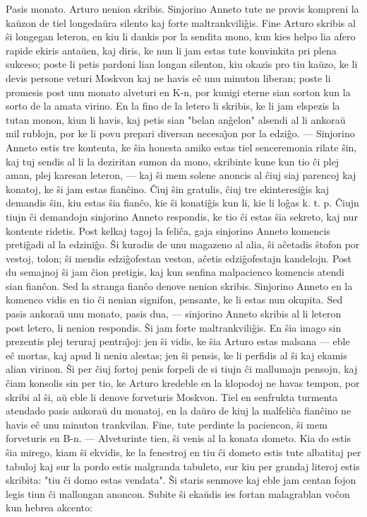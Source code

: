    Pasis monato. Arturo nenion skribis. Sinjorino Anneto tute ne
provis kompreni la ka\u uzon de tiel longeda\u ura silento kaj forte
maltrankvili\^gis. Fine Arturo skribis al \^si longegan leteron, en
kiu li dankis por la sendita mono, kun kies helpo lia afero rapide
ekiris anta\u uen, kaj diris, ke nun li jam estas tute konvinkita
pri plena sukceso; poste li petis pardoni lian longan silenton, kiu
okazis pro tiu ka\u uzo, ke li devis persone veturi Moskvon kaj ne
havis e\^c unu minuton liberan; poste li promesis post unu monato
alveturi en K-n, por kunigi eterne sian sorton kun la sorto de la
amata virino. En la fino de la letero li skribis, ke li jam elspezis
la tutan monon, kiun li havis, kaj petis sian "belan an\^gelon"
alsendi al li ankora\u u mil rublojn, por ke li povu prepari
diversan necesa\^{\j}on por la edzi\^go. --- Sinjorino Anneto estis
tre kontenta, ke \^sia honesta amiko estas tiel senceremonia rilate
\^sin, kaj tuj sendis al li la deziritan sumon da mono, skribinte
kune kun tio \^ci plej aman, plej karesan leteron, --- kaj \^si mem
solene anoncis al \^ciuj siaj parencoj kaj konatoj, ke \^si jam
estas fian\^cino. \^Ciuj \^sin gratulis, \^ciuj tre ekinteresi\^gis
kaj demandis \^sin, kiu estas \^sia fian\^co, kie \^si konati\^gis
kun li, kie li lo\^gas k. t. p. \^Ciujn tiujn \^ci demandojn
sinjorino Anneto respondis, ke tio \^ci estas \^sia sekreto, kaj nur
kontente ridetis. Post kelkaj tagoj la feli\^ca, gaja sinjorino
Anneto komencis preti\^gadi al la edzini\^go. \^Si kuradis de unu
magazeno al alia, \^si a\^cetadis \^stofon por vestoj, tolon; \^si
mendis edzi\^gofestan veston, a\^cetis edzi\^gofestajn kandelojn.
Post du semajnoj \^si jam \^cion pretigis, kaj kun senfina
malpacienco komencis atendi sian fian\^con. Sed la stranga fian\^co
denove nenion skribis. Sinjorino Anneto en la komenco vidis en tio
\^ci nenian signifon, pensante, ke li estas nun okupita. Sed pasis
ankora\u u unu monato, pasis dua, --- sinjorino Anneto skribis al li
leteron post letero, li nenion respondis. \^Si jam forte
maltrankvili\^gis. En \^sia imago sin prezentis plej teruraj
pentra\^{\j}oj: jen \^si vidis, ke \^sia Arturo estas malsana
 --- eble e\^c mortas, kaj apud li neniu alestas; jen \^si pensis, ke
li perfidis al \^si kaj ekamis alian virinon. \^Si per \^ciuj fortoj
penis forpeli de si tiujn \^ci mallumajn pensojn, kaj \^ciam
konsolis sin per tio, ke Arturo kredeble en la klopodoj ne havas
tempon, por skribi al \^si, a\u u eble li denove forveturis Moskvon.
Tiel en senfrukta turmenta atendado pasis ankora\u u du monatoj, en
la da\u uro de kiuj la malfeli\^ca fian\^cino ne havis e\^c unu
minuton trankvilan. Fine, tute perdinte la paciencon, \^si mem
forveturis en B-n. --- Alveturinte tien, \^si venis al la konata
dometo. Kia do estis \^sia mirego, kiam \^si ekvidis, ke la
fenestroj en tiu \^ci dometo estis tute albatitaj per tabuloj kaj
sur la pordo estis malgranda tabuleto, sur kiu per grandaj literoj
estis skribita: "tiu \^ci domo estas vendata". \^Si staris senmove
kaj eble jam centan fojon legis tiun \^ci mallongan anoncon. Subite
\^si eka\u udis ies fortan malagrablan vo\^con kun hebrea akcento:

